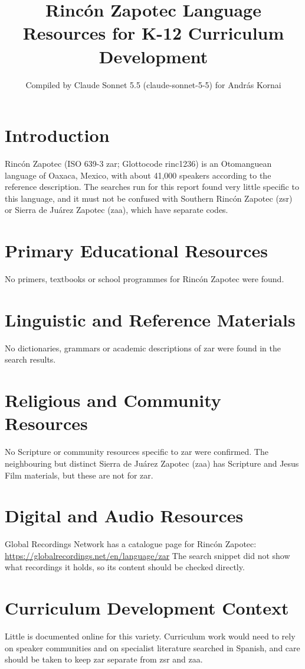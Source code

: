 \documentclass[12pt]{article}
\title{Rinc\'on Zapotec Language Resources for K-12 Curriculum Development}
\author{Compiled by Claude Sonnet 5.5 (claude-sonnet-5-5) for Andr\'as Kornai}
\date{}
\begin{document}
\maketitle

\section{Introduction}
Rinc\'on Zapotec (ISO 639-3 zar; Glottocode rinc1236) is an Otomanguean language of Oaxaca, Mexico, with about 41,000 speakers according to the reference description. The searches run for this report found very little specific to this language, and it must not be confused with Southern Rinc\'on Zapotec (zsr) or Sierra de Ju\'arez Zapotec (zaa), which have separate codes.

\section{Primary Educational Resources}
No primers, textbooks or school programmes for Rinc\'on Zapotec were found.

\section{Linguistic and Reference Materials}
No dictionaries, grammars or academic descriptions of zar were found in the search results.

\section{Religious and Community Resources}
No Scripture or community resources specific to zar were confirmed. The neighbouring but distinct Sierra de Ju\'arez Zapotec (zaa) has Scripture and Jesus Film materials, but these are not for zar.

\section{Digital and Audio Resources}
Global Recordings Network has a catalogue page for Rinc\'on Zapotec: \url{https://globalrecordings.net/en/language/zar} The search snippet did not show what recordings it holds, so its content should be checked directly.

\section{Curriculum Development Context}
Little is documented online for this variety. Curriculum work would need to rely on speaker communities and on specialist literature searched in Spanish, and care should be taken to keep zar separate from zsr and zaa.
\end{document}
